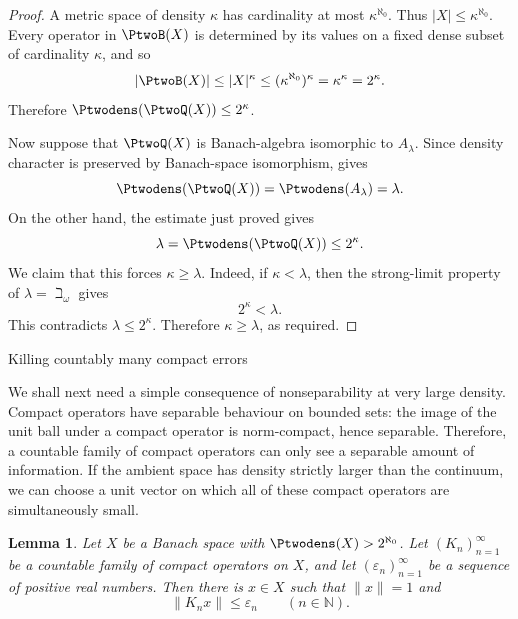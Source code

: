 \documentclass[11pt,reqno]{amsart}
\makeatletter
\theoremstyle{plain}
\newtheorem{lemma}[lemma]{Lemma}
\theoremstyle{definition}
\newcommand{\N}{\mathbb N}
\newcommand{\eps}{\varepsilon}
\newcounter{problempaper}
\newenvironment{problempaperbody}{%
  \setcounter{subsection}{0}%
  \setcounter{subsubsection}{0}%
  \setcounter{paragraph}{0}%
  \renewcommand{\thesubsection}{\arabic{subsection}}%
  \renewcommand{\thesubsubsection}{\thesubsection.\arabic{subsubsection}}%
  \renewcommand{\theparagraph}{\thesubsubsection.\arabic{paragraph}}%
  \let\problem@outersection\section
  \let\problem@outersubsection\subsection
  \let\problem@outersubsubsection\subsubsection
  \let\problem@outerparagraph\paragraph
  \let\section\problem@papersection
  \let\subsection\problem@papersubsection
  \let\subsubsection\problem@papersubsubsection
}{%
  \let\section\problem@outersection
  \let\subsection\problem@outersubsection
  \let\subsubsection\problem@outersubsubsection
  \let\paragraph\problem@outerparagraph
}
\newcommand{\problem@target}[2]{%
  \hypertarget{problem-\theproblempaper-#1-#2}{}%
}
\newcommand{\problem@paperheading}[3]{%
  \par\bigskip
  \problem@target{#1}{#2}%
  \noindent{\large\bfseries #2.\quad #3\par}%
  \nobreak\smallskip
}
\newcommand{\problem@papersubheading}[3]{%
  \par\medskip
  \problem@target{#1}{#2}%
  \noindent{\normalsize\bfseries #2.\quad #3\par}%
  \nobreak\smallskip
}
\newcommand{\problem@papersubsubheading}[3]{%
  \par\smallskip
  \problem@target{#1}{#2}%
  \noindent{\normalsize\itshape #2.\quad #3.\ }%
}
\def\problem@papersection{%
  \@ifstar{\problem@papersectionstar}{\problem@papersectionnostar}%
}
\def\problem@papersectionstar#1{%
  \par\bigskip\noindent{\large\bfseries #1\par}\nobreak\smallskip
}
\def\problem@papersectionnostar#1{%
  \refstepcounter{subsection}%
  \setcounter{subsubsection}{0}%
  \setcounter{paragraph}{0}%
  \problem@paperheading{section}{\thesubsection}{#1}%
  \problem@writecontentsline{section}{\thesubsection}{#1}%
}
\def\problem@papersubsection{%
  \@ifstar{\problem@papersubsectionstar}{\problem@papersubsectionnostar}%
}
\def\problem@papersubsectionstar#1{%
  \par\medskip\noindent{\normalsize\bfseries #1\par}\nobreak\smallskip
}
\def\problem@papersubsectionnostar#1{%
  \refstepcounter{subsubsection}%
  \setcounter{paragraph}{0}%
  \problem@papersubheading{subsection}{\thesubsubsection}{#1}%
  \problem@writecontentsline{subsection}{\thesubsubsection}{#1}%
}
\def\problem@papersubsubsection{%
  \@ifstar{\problem@papersubsubsectionstar}{\problem@papersubsubsectionnostar}%
}
\def\problem@papersubsubsectionstar#1{%
  \par\smallskip\noindent{\normalsize\itshape #1.\ }%
}
\def\problem@papersubsubsectionnostar#1{%
  \refstepcounter{paragraph}%
  \problem@papersubsubheading{subsubsection}{\theparagraph}{#1}%
  \problem@writecontentsline{subsubsection}{\theparagraph}{#1}%
}
\newcommand{\problem@writecontentsline}[3]{%
  \begingroup
  \protected@write\@auxout{}{%
    \string\problemcontentsentry{\theproblempaper}{#1}{#2}{#3}{\thepage}%
  }%
  \endgroup
}
\newcommand{\problemcontentsentry}[5]{%
  \@ifundefined{problemcontents@#1}{%
    \expandafter\gdef\csname problemcontents@#1\endcsname{}%
  }{}%
  \expandafter\g@addto@macro\csname problemcontents@#1\endcsname{%
    \problemcontentsline{#1}{#2}{#3}{#4}{#5}%
  }%
}
\newcommand{\problemcontentslink}[4]{%
  \hyperlink{problem-#1-#2-#3}{#4}%
}
\newcommand{\problemcontentsline}[5]{%
  \ifstrequal{#2}{section}{%
    \par\noindent
    \problemcontentslink{#1}{#2}{#3}{\makebox[2.5em][l]{#3}#4}%
    \nobreak\dotfill
    \problemcontentslink{#1}{#2}{#3}{#5}\par
  }{%
    \ifstrequal{#2}{subsection}{%
      \par\noindent\hspace*{1.5em}%
      \problemcontentslink{#1}{#2}{#3}{\makebox[3.5em][l]{#3}#4}%
      \nobreak\dotfill
      \problemcontentslink{#1}{#2}{#3}{#5}\par
    }{%
      \par\noindent\hspace*{3em}%
      \problemcontentslink{#1}{#2}{#3}{\makebox[4.5em][l]{#3}#4}%
      \nobreak\dotfill
      \problemcontentslink{#1}{#2}{#3}{#5}\par
    }%
  }%
}
\makeatother
\begin{document}
\begin{problempaperbody}
\begin{proof}
A metric space of density $\kappa$ has cardinality at most $\kappa^{\aleph_0}$. Thus $|X|\leq\kappa^{\aleph_0}$. Every operator in $\PtwoB(X)$ is determined by its values on a fixed dense subset of cardinality $\kappa$, and so
\begin{equation*}
        |\PtwoB(X)|\leq |X|^\kappa\leq(\kappa^{\aleph_0})^\kappa=\kappa^\kappa=2^\kappa.
\end{equation*}
Therefore $\Ptwodens(\PtwoQ(X))\leq2^\kappa$.

Now suppose that $\PtwoQ(X)$ is Banach-algebra isomorphic to $A_\lambda$. Since density character is preserved by Banach-space isomorphism,  gives
\begin{equation*}
        \Ptwodens(\PtwoQ(X))=\Ptwodens(A_\lambda)=\lambda.
\end{equation*}
On the other hand, the estimate just proved gives
\begin{equation*}
        \lambda=\Ptwodens(\PtwoQ(X))\leq 2^\kappa.
\end{equation*}
We claim that this forces $\kappa\geq\lambda$. Indeed, if $\kappa<\lambda$, then the strong-limit property of $\lambda=\beth_\omega$ gives
\begin{equation*}
        2^\kappa<\lambda.
\end{equation*}
This contradicts $\lambda\leq2^\kappa$. Therefore $\kappa\geq\lambda$, as required.
\end{proof}

\subsection{Killing countably many compact errors}
\label{p2-second:sec:compact-killing}

We shall next need a simple consequence of nonseparability at very large density. Compact operators have separable behaviour on bounded sets: the image of the unit ball under a compact operator is norm-compact, hence separable. Therefore, a countable family of compact operators can only see a separable amount of information. If the ambient space has density strictly larger than the continuum, we can choose a unit vector on which all of these compact operators are simultaneously small.

\begin{lemma}
\label{p2-second:lem:compact-killing}
Let $X$ be a Banach space with $\Ptwodens(X)>2^{\aleph_0}$. Let $(K_n)_{n=1}^{\infty}$ be a countable family of compact operators on $X$, and let $(\eps_n)_{n=1}^{\infty}$ be a sequence of positive real numbers. Then there is $x\in X$ such that $\|x\|=1$ and
\begin{equation*}
        \|K_nx\|\leq\eps_n \qquad(n\in\N).
\end{equation*}
\end{lemma}


\end{problempaperbody}
\end{document}
